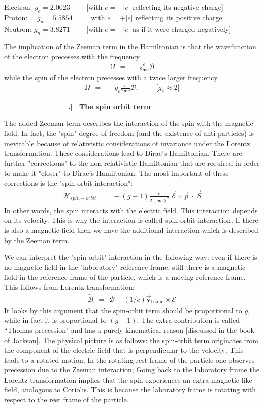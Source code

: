 \documentclass[onecolumn,fleqn]{revtex4}
\newcommand{\mass}{\mathsf{m}}
\newcommand{\beq}{\begin{eqnarray}}
\newcommand{\eeq}{\end{eqnarray}}
\renewcommand{\thesubsection}{\arabic{subsection}}
\renewcommand{\thesubsubsection}{\arabic{subsubsection}}
\newcommand{\sheadC}[1]
{
\addtocounter{subsubsection}{1}
\vspace{5mm}
{\Large\bf $=\!=\!=\!=\!=\!=\;$ [\thesubsection.\thesubsubsection] \ #1}  
\nopagebreak
\phantomsection
}
\begin{document}
Electron: ${g_e = 2.0023 }$  \ \ \ \ [with $e=-|e|$ reflecting its negative charge] \\
Proton: \ \ ${g_p= 5.5854 }$  \ \ \ \ [with $e=+|e|$ reflecting its positive charge]  \\
Neutron: ${g_n= 3.8271 }$ \ \ \ \ [with $e=-|e|$ as if it were charged negatively] 

The implication of the Zeeman term in the Hamiltonian 
is that the wavefunction of the electron 
precesses with the frequency
\beq
\Omega \ \ = \ \ -\frac{e}{2\mass c}\mathcal{B} 
\eeq
while the spin of the electron precesses 
with a twice larger frequency
\beq
\Omega \ \ = \ \ -g_e\frac{e}{2\mass c}\mathcal{B}, 
\ \ \ \ \ \ \ \ \ \ \ \Big[g_e \approx 2\Big]
\eeq



\sheadC{The spin orbit term}

The added Zeeman term describes the interaction of the spin with the 
magnetic field. In fact, the "spin" degree of freedom 
(and the existence of anti-particles) is inevitable because 
of relativistic considerations of invariance under 
the Lorentz transformation. These considerations 
lead to Dirac's Hamiltonian. There are further "corrections" 
to the non-relativistic Hamiltonian that are required in order 
to make it "closer" to Dirac's Hamiltonian. 
The most important of these corrections is the "spin orbit interaction":
\beq
\mathcal{H}_{spin-orbit} 
\ \ = \ \ -(g{-}1)\frac{e}{2(\mass c)^2} \ \vec{\mathcal{E}} \times \vec{p} \ \cdot \ \vec{S} 
\eeq
In other words, the spin interacts with the 
electric field. This interaction depends on its  
velocity. This is why the interaction is called 
spin-orbit interaction. If there is also 
a magnetic field then we have the additional 
interaction which is described by the Zeeman term. 


We can interpret the "spin-orbit" interaction 
in the following way: even if there is 
no magnetic field in the "laboratory" reference 
frame, still there is a magnetic field 
in the reference frame of the particle, 
which is a moving reference frame.  
This follows from Lorentz transformation:
\beq
\tilde{\mathcal{B}}
\ \ = \ \ \mathcal{B} - (1/c)\vec{\mathbf{v}}_{\mbox{frame}} \times \mathcal{E}
\eeq
It looks by this argument that the spin-orbit term should be 
proportional to $g$, while in fact it is proportional to ${(g{-}1)}$.
The extra contribution is called ``Thomas precession" and has 
a purely kinematical reason [discussed in the book of Jackson]. 
The physical picture is as follows: the spin-orbit term originates 
from the component of the electric field that is perpendicular
to the velocity; This leads to a rotated motion; 
In the rotating rest-frame of the particle one observes
precession due to the Zeeman interaction; Going back to 
the laboratory frame the Lorentz transformation implies 
that the spin experiences an extra magnetic-like field, 
analogous to Coriolis. This is because the laboratory frame 
is rotating with respect to the rest frame of the particle.     
 
\end{document}
